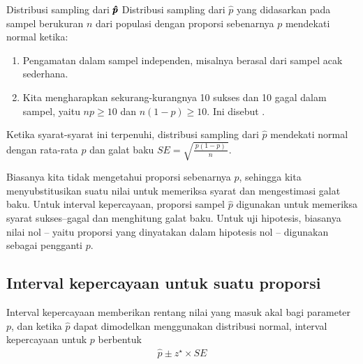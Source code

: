 \begin{onebox}{Distribusi sampling dari
    $\pmb{\hat{\MakeLowercase{p}}}$}
  Distribusi sampling dari $\hat{p}$ yang didasarkan pada
  sampel berukuran $n$ dari populasi dengan
  proporsi sebenarnya $p$ mendekati normal ketika:
  \begin{enumerate}
  \setlength{\itemsep}{0mm}
  \item Pengamatan dalam sampel independen,
      misalnya berasal dari sampel acak sederhana.
  \item Kita mengharapkan sekurang-kurangnya 10 sukses dan
      10 gagal dalam sampel, yaitu $np\geq10$ dan
      $n(1-p)\geq10$.
      Ini disebut .
  \end{enumerate}
  Ketika syarat-syarat ini terpenuhi, distribusi sampling
  dari $\hat{p}$ mendekati normal dengan rata-rata
  $p$ dan galat baku
  $SE = \sqrt{\frac{\ p(1-p)\ }{n}}$.
\end{onebox}

Biasanya kita tidak mengetahui proporsi sebenarnya $p$,
sehingga kita menyubstitusikan suatu nilai untuk memeriksa syarat
dan mengestimasi galat baku.
Untuk interval kepercayaan, proporsi sampel
$\hat{p}$ digunakan untuk memeriksa syarat sukses--gagal
dan menghitung galat baku.
Untuk uji hipotesis, biasanya nilai nol --
yaitu proporsi yang dinyatakan dalam hipotesis nol --
digunakan sebagai pengganti $p$.


\subsection{Interval kepercayaan untuk suatu proporsi}
\label{confIntForPropSection}


Interval kepercayaan memberikan rentang
nilai yang masuk akal bagi parameter $p$,
dan ketika $\hat{p}$ dapat dimodelkan menggunakan
distribusi normal, interval kepercayaan
untuk $p$ berbentuk
\begin{align*}
\hat{p} \pm z^{\star} \times SE
\end{align*}


\newcommand{\paydayN}{826}
\newcommand{\paydayNHalf}{413}
\newcommand{\paydayRegPerc}{70\%}
\newcommand{\paydayRegProp}{0.70}
\newcommand{\paydayRegSE}{0.016}
\newcommand{\paydayRegSEPerc}{1.6\%}
\newcommand{\paydayRegLower}{0.669}
\newcommand{\paydayRegUpper}{0.731}
\newcommand{\paydayRegLowerPerc}{66.9\%}
\newcommand{\paydayRegUpperPerc}{73.1\%}

